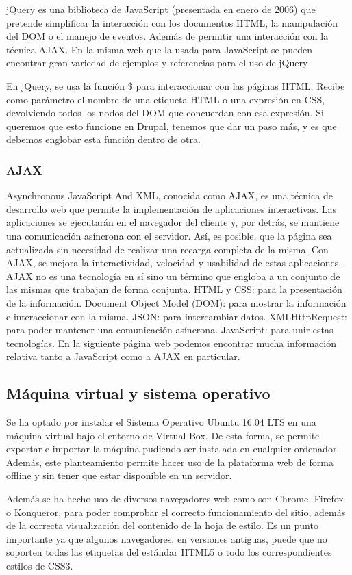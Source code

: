 jQuery es una biblioteca de JavaScript (presentada en enero de 2006) que pretende simplificar la interacción con los documentos HTML, la manipulación del DOM o el manejo de eventos. Además de permitir una interacción con la técnica AJAX.
En la misma web que la usada para JavaScript se pueden encontrar gran variedad de ejemplos y referencias para el uso de jQuery

En jQuery, se usa la función \$ para interaccionar con las páginas HTML. Recibe como parámetro el nombre de una etiqueta HTML o una expresión en CSS, devolviendo todos los nodos del DOM que concuerdan con esa expresión. Si queremos que esto funcione en Drupal, tenemos que dar un paso más, y es que debemos englobar esta función dentro de otra.

\subsubsection{AJAX}
Asynchronous JavaScript And XML, conocida como AJAX, es una técnica de desarrollo web que permite la implementación de aplicaciones interactivas. Las aplicaciones se ejecutarán en el navegador del cliente y, por detrás, se mantiene una comunicación asíncrona con el servidor. Así, es posible, que la página sea actualizada sin necesidad de realizar una recarga completa de la misma. Con AJAX, se mejora la interactividad, velocidad y usabilidad de estas aplicaciones. AJAX no es una tecnología en sí sino un término que engloba a un conjunto de las mismas que trabajan de forma conjunta. HTML y CSS: para la presentación de la información. Document Object Model (DOM): para mostrar la información e interaccionar con la misma. JSON: para intercambiar datos. XMLHttpRequest: para poder mantener una comunicación asíncrona. JavaScript: para unir estas tecnologías. En la siguiente página web podemos encontrar mucha información relativa tanto a JavaScript como a AJAX en particular.

\subsection{Máquina virtual y sistema operativo}
Se ha optado por instalar el Sistema Operativo Ubuntu 16.04 LTS en una máquina virtual bajo el entorno de Virtual Box. De esta forma, se permite exportar e importar la máquina pudiendo ser instalada en cualquier ordenador. Además, este planteamiento permite hacer uso de la plataforma web de forma offline y sin tener que estar disponible en un servidor.

Además se ha hecho uso de diversos navegadores web como son Chrome, Firefox o Konqueror, para poder comprobar el correcto funcionamiento del sitio, además de la correcta visualización del contenido de la hoja de estilo. Es un punto importante ya que algunos navegadores, en versiones antiguas, puede que no soporten todas las etiquetas del estándar HTML5 o todo los correspondientes estilos de CSS3.
